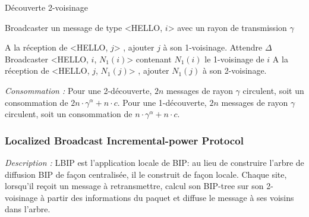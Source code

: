 \begin{algorithm}[H]
\caption{Découverte 2-voisinage}
\label{algo_k_voisinage}
\begin{algorithmic}

	\STATE Broadcaster un message de type <HELLO, $i$> avec un rayon de transmission $\gamma$
\ENDFOR

\STATE A la réception de <HELLO, $j$> , ajouter $j$ à son 1-voisinage.
\STATE Attendre $\Delta$
	\STATE Broadcaster <HELLO, $i$, $N_1(i)$> contenant $N_1(i)$ le 1-voisinage de $i$
	\STATE A la réception de <HELLO, $j$, $N_1(j)$> , ajouter $N_1(j)$ à son 2-voisinage.
	
\ENDFOR
\end{algorithmic}
\end{algorithm}

\emph{Consommation :} Pour une 2-découverte, $2n$ messages de rayon $\gamma$ circulent, soit un consommation de $2n\cdot \gamma^\alpha +  n\cdot c$.
Pour une 1-découverte, $2n$ messages de rayon $\gamma$ circulent, soit un consommation de $n\cdot \gamma^\alpha +  n\cdot c$.



\subsubsection{Localized Broadcast Incremental-power Protocol  \cite{Ingelrest2008}}

\emph{Description :} LBIP est l'application locale de BIP: au lieu de construire l'arbre de diffusion BIP de façon centralisée, il le construit de façon locale.
Chaque site, lorsqu'il reçoit un message à retransmettre, calcul son BIP-tree sur son 2-voisinage à partir des informations du paquet et diffuse le message à ses voisins dans l'arbre.


